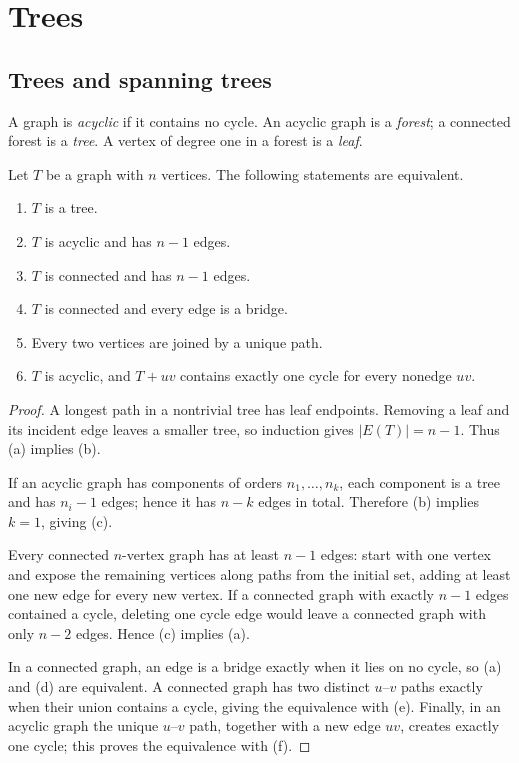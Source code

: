 \chapter{Trees}

\section{Trees and spanning trees}

\begin{notedefinition}
A graph is \emph{acyclic} if it contains no cycle.  An acyclic graph is a \emph{forest}; a connected forest is a \emph{tree}.  A vertex of degree one in a forest is a \emph{leaf}.
\end{notedefinition}

\begin{notetheorem}
Let $T$ be a graph with $n$ vertices.  The following statements are equivalent.
\begin{enumerate}
  \item $T$ is a tree.
  \item $T$ is acyclic and has $n-1$ edges.
  \item $T$ is connected and has $n-1$ edges.
  \item $T$ is connected and every edge is a bridge.
  \item Every two vertices are joined by a unique path.
  \item $T$ is acyclic, and $T+uv$ contains exactly one cycle for every nonedge $uv$.
\end{enumerate}
\end{notetheorem}
\begin{proof}
A longest path in a nontrivial tree has leaf endpoints.  Removing a leaf and its incident edge leaves a smaller tree, so induction gives $|E(T)|=n-1$.  Thus (a) implies (b).

If an acyclic graph has components of orders $n_1,\ldots,n_k$, each component is a tree and has $n_i-1$ edges; hence it has $n-k$ edges in total.  Therefore (b) implies $k=1$, giving (c).

Every connected $n$-vertex graph has at least $n-1$ edges: start with one vertex and expose the remaining vertices along paths from the initial set, adding at least one new edge for every new vertex.  If a connected graph with exactly $n-1$ edges contained a cycle, deleting one cycle edge would leave a connected graph with only $n-2$ edges.  Hence (c) implies (a).

In a connected graph, an edge is a bridge exactly when it lies on no cycle, so (a) and (d) are equivalent.  A connected graph has two distinct $u$--$v$ paths exactly when their union contains a cycle, giving the equivalence with (e).  Finally, in an acyclic graph the unique $u$--$v$ path, together with a new edge $uv$, creates exactly one cycle; this proves the equivalence with (f).
\end{proof}

